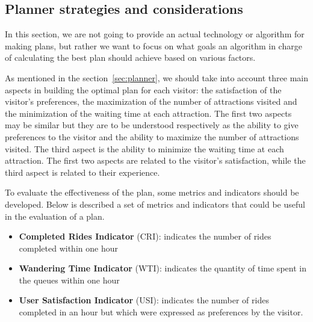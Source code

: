 \subsection{Planner strategies and considerations}
In this section, we are not going to provide an actual technology or algorithm for making plans, but rather we want to focus on what goals an
algorithm in charge of calculating the best plan should achieve based on various factors.

As mentioned in the section~\ref{sec:planner}, we should take into account three main aspects in building the optimal plan for each visitor: the
satisfaction of the visitor's preferences, the maximization of the number of attractions visited and the minimization of the waiting time at each
attraction. The first two aspects may be similar but they are to be understood respectively as the ability to give preferences to the visitor and the
ability to maximize the number of attractions visited. The third aspect is the ability to minimize the waiting time at each attraction. The first two
aspects are related to the visitor's satisfaction, while the third aspect is related to their experience.

To evaluate the effectiveness of the plan, some metrics and indicators should be developed. Below is described a set of metrics and indicators that
could be useful in the evaluation of a plan.

\begin{itemize}
	\item \textbf{Completed Rides Indicator} (CRI): indicates the number of rides completed within one hour
	\item \textbf{Wandering Time Indicator} (WTI): indicates the quantity of time spent in the queues within one hour
	\item \textbf{User Satisfaction Indicator} (USI): indicates the number of rides completed in an hour but which were expressed as preferences by the visitor.
\end{itemize}

